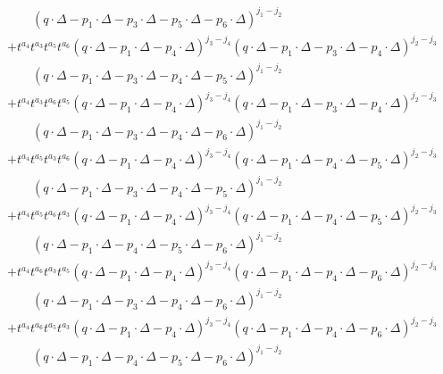 \documentclass[12pt]{article}
\begin{document}
\begin{eqnarray}
    \nonumber
    \\
    &&\qquad (q\cdot \Delta-p_1\cdot \Delta-p_3\cdot \Delta-p_5\cdot \Delta-p_6\cdot \Delta)^{j_1-j_2}
    \nonumber
    \\
    &&
+ t^{a_4} t^{a_3} t^{a_5} t^{a_6} 
    (q\cdot \Delta-p_1\cdot \Delta-p_4\cdot \Delta)^{j_3-j_4} (q\cdot \Delta-p_1\cdot \Delta-p_3\cdot \Delta-p_4\cdot \Delta)^{j_2-j_3} 
    \nonumber
    \\
    &&\qquad (q\cdot \Delta-p_1\cdot \Delta-p_3\cdot \Delta-p_4\cdot \Delta-p_5\cdot \Delta)^{j_1-j_2}
    \nonumber
    \\
    &&
+ t^{a_4} t^{a_3} t^{a_6} t^{a_5} 
    (q\cdot \Delta-p_1\cdot \Delta-p_4\cdot \Delta)^{j_3-j_4} (q\cdot \Delta-p_1\cdot \Delta-p_3\cdot \Delta-p_4\cdot \Delta)^{j_2-j_3} 
    \nonumber
    \\
    &&\qquad (q\cdot \Delta-p_1\cdot \Delta-p_3\cdot \Delta-p_4\cdot \Delta-p_6\cdot \Delta)^{j_1-j_2}
    \nonumber
    \\
    &&
+ t^{a_4} t^{a_5} t^{a_3} t^{a_6} 
    (q\cdot \Delta-p_1\cdot \Delta-p_4\cdot \Delta)^{j_3-j_4} (q\cdot \Delta-p_1\cdot \Delta-p_4\cdot \Delta-p_5\cdot \Delta)^{j_2-j_3} 
    \nonumber
    \\
    &&\qquad (q\cdot \Delta-p_1\cdot \Delta-p_3\cdot \Delta-p_4\cdot \Delta-p_5\cdot \Delta)^{j_1-j_2}
    \nonumber
    \\
    &&
+ t^{a_4} t^{a_5} t^{a_6} t^{a_3} 
    (q\cdot \Delta-p_1\cdot \Delta-p_4\cdot \Delta)^{j_3-j_4} (q\cdot \Delta-p_1\cdot \Delta-p_4\cdot \Delta-p_5\cdot \Delta)^{j_2-j_3} 
    \nonumber
    \\
    &&\qquad (q\cdot \Delta-p_1\cdot \Delta-p_4\cdot \Delta-p_5\cdot \Delta-p_6\cdot \Delta)^{j_1-j_2}
    \nonumber
    \\
    &&
+ t^{a_4} t^{a_6} t^{a_3} t^{a_5} 
    (q\cdot \Delta-p_1\cdot \Delta-p_4\cdot \Delta)^{j_3-j_4} (q\cdot \Delta-p_1\cdot \Delta-p_4\cdot \Delta-p_6\cdot \Delta)^{j_2-j_3} 
    \nonumber
    \\
    &&\qquad (q\cdot \Delta-p_1\cdot \Delta-p_3\cdot \Delta-p_4\cdot \Delta-p_6\cdot \Delta)^{j_1-j_2}
    \nonumber
    \\
    &&
+ t^{a_4} t^{a_6} t^{a_5} t^{a_3} 
    (q\cdot \Delta-p_1\cdot \Delta-p_4\cdot \Delta)^{j_3-j_4} (q\cdot \Delta-p_1\cdot \Delta-p_4\cdot \Delta-p_6\cdot \Delta)^{j_2-j_3} 
    \nonumber
    \\
    &&\qquad (q\cdot \Delta-p_1\cdot \Delta-p_4\cdot \Delta-p_5\cdot \Delta-p_6\cdot \Delta)^{j_1-j_2}
    \nonumber

\end{eqnarray}
\end{document}
